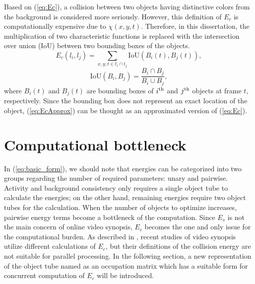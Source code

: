 \documentclass[11pt]{hyu_thesis}
\begin{document}
Based on (\ref{eq:Ec}), a collision between two objects having distinctive colors from the background is considered more seriously. However, this definition of $E_c$ is computationally expensive due to $\chi(x,y,t)$. Therefore, in this dissertation, the multiplication of two characteristic functions is replaced with the intersection over union (IoU) between two bounding boxes of the objects.
\begin{equation}
\label{eq:EcApprox}
E_c(l_i,l_j)=\sum_{x,y,t \in t_i \cap t_j} \textrm{IoU} \left( B_i(t),B_j(t) \right),
\end{equation}
\begin{equation}
\textrm{IoU}(B_i,B_j)=\frac{B_i \cap B_j}{B_i \cup B_j},
\end{equation}
where $B_i(t)$ and $B_j(t)$ are bounding boxes of $i^{\rm{th}}$ and $j^{\rm{th}}$ objects at frame $t$, respectively. Since the bounding box does not represent an exact location of the object, (\ref{eq:EcApprox}) can be thought as an approximated version of (\ref{eq:Ec}).

\section{Computational bottleneck}
In (\ref{eq:basic_form}), we should note that energies can be categorized into two groups regarding the number of required parameters: unary and pairwise. Activity and background consistency only requires a single object tube to calculate the energies; on the other hand, remaining energies require two object tubes for the calculation. When the number of objects to optimize increases, pairwise energy terms become a bottleneck of the computation. Since $E_s$ is not the main concern of online video synopsis, $E_c$ becomes the one and only issue for the computational burden. As described in , recent studies of video synopsis~\cite{He2017} utilize different calculations of $E_c$, but their definitions of the collision energy are not suitable for parallel processing. In the following section, a new representation of the object tube named as an occupation matrix which has a suitable form for concurrent computation of $E_c$ will be introduced.
\end{document}
